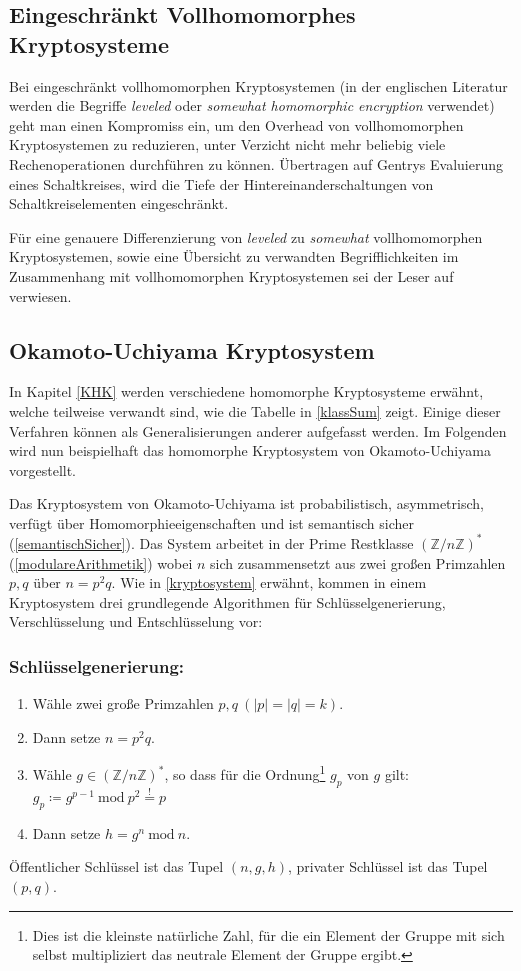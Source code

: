 \subsection{Eingeschränkt Vollhomomorphes Kryptosysteme}
\label{LHE}
Bei eingeschränkt vollhomomorphen Kryptosystemen (in der englischen Literatur werden die Begriffe \textit{leveled} oder \textit{somewhat homomorphic encryption} verwendet) geht man einen Kompromiss ein, um den Overhead von vollhomomorphen Kryptosystemen zu reduzieren, unter Verzicht nicht mehr beliebig viele Rechenoperationen durchführen zu können. Übertragen auf Gentrys Evaluierung eines Schaltkreises, wird die Tiefe der Hintereinanderschaltungen von Schaltkreiselementen eingeschränkt.

Für eine genauere Differenzierung von \textit{leveled} zu \textit{somewhat} vollhomomorphen Kryptosystemen, sowie eine Übersicht zu verwandten Begrifflichkeiten im Zusammenhang mit vollhomomorphen Kryptosystemen sei der Leser auf \cite[p.5+14]{armknecht2015guide} verwiesen.

\subsection{Okamoto-Uchiyama Kryptosystem}
\label{OUK}

In Kapitel \ref{KHK} werden verschiedene homomorphe Kryptosysteme erwähnt, welche teilweise verwandt sind, wie die Tabelle in \ref{klassSum} zeigt. Einige dieser Verfahren können als Generalisierungen anderer aufgefasst werden. Im Folgenden wird nun beispielhaft das homomorphe Kryptosystem von Okamoto-Uchiyama \cite[p.311]{okamoto1998new} vorgestellt.

Das Kryptosystem von Okamoto-Uchiyama ist probabilistisch, asymmetrisch, verfügt über Homomorphieeigenschaften und ist semantisch sicher (\ref{semantischSicher}). Das System arbeitet in der Prime Restklasse  $(\mathbb{Z}/n\mathbb{Z})^*$ (\ref{modulareArithmetik}) wobei $n$ sich zusammensetzt aus zwei großen Primzahlen $p,q$ über $n=p^2 q$. Wie in \ref{kryptosystem} erwähnt, kommen in einem Kryptosystem drei grundlegende Algorithmen für Schlüsselgenerierung, Verschlüsselung und Entschlüsselung vor:

\subsubsection*{Schlüsselgenerierung:}
\begin{enumerate}
	 \item Wähle zwei große Primzahlen $p,q\ (|p|=|q|=k)$.
	 \item Dann setze $n=p^2 q$.
	 \item Wähle $g\in(\mathbb{Z}/ n\mathbb{Z})^*$, so dass für die Ordnung\footnote{Dies ist die kleinste natürliche Zahl, für die ein Element der Gruppe mit sich selbst multipliziert das neutrale Element der Gruppe ergibt.} $g_p$ von $g$ gilt: $g_p \coloneqq g^{p-1}\ \text{mod}\ p^2 \stackrel{!}{=} p$
	 \item Dann setze  $h=g^n\ \text{mod}\ n$.
\end{enumerate}
Öffentlicher Schlüssel ist das Tupel $(n,g,h)$, privater Schlüssel ist das Tupel $(p,q)$.

